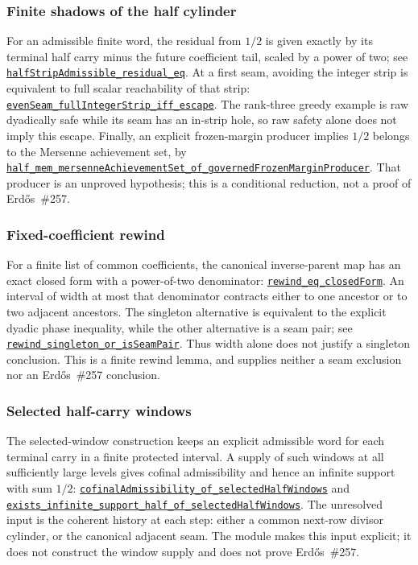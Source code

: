 \documentclass[11pt]{article}
\newcommand{\commit}{81150c1c6fdd4cd51e76d3aa0de344341e0e9e7c}
\newcommand{\repobase}{https://github.com/wcook04/plectis-lean-erdos249-257/blob/\commit}
\newcommand{\PK}{Erdos249257}
\newcommand{\lref}[3]{\href{\repobase/\PK/#1\#L#2}{\nolinkurl{#3}}}
\newcommand{\lrefx}[3]{\href{\repobase/\PK/#1\#L#2}{\nolinkurl{#3}}}
\theoremstyle{definition}
\theoremstyle{remark}
\begin{document}
\subsubsection{Finite shadows of the half cylinder}\label{res:halfcylindershadow}

For an admissible finite word, the residual from $1/2$ is given exactly by its
terminal half carry minus the future coefficient tail, scaled by a power of
two; see
\lref{HalfCylinderFiniteShadow.lean}{55}{halfStripAdmissible_residual_eq}.
At a first seam, avoiding the integer strip is equivalent to full scalar
reachability of that strip:
\lrefx{HalfCylinderFiniteShadow.lean}{807}{evenSeam_fullIntegerStrip_iff_escape}.
The rank-three greedy example is raw dyadically safe while its seam has an
in-strip hole, so raw safety alone does not imply this escape.  Finally, an
explicit frozen-margin producer implies $1/2$ belongs to the Mersenne
achievement set, by
\lrefx{HalfCylinderFiniteShadow.lean}{1256}{half_mem_mersenneAchievementSet_of_governedFrozenMarginProducer}.
That producer is an unproved hypothesis; this is a conditional reduction, not
a proof of Erd\H{o}s~\#257.

\subsubsection{Fixed-coefficient rewind}\label{res:fixedcoeffrewind}

For a finite list of common coefficients, the canonical inverse-parent map has
an exact closed form with a power-of-two denominator:
\lref{HalfCarryCeilParentContraction.lean}{49}{rewind_eq_closedForm}.
An interval of width at most that denominator contracts either to one ancestor
or to two adjacent ancestors.  The singleton alternative is equivalent to the
explicit dyadic phase inequality, while the other alternative is a seam pair;
see
\lrefx{HalfCarryCeilParentContraction.lean}{180}{rewind_singleton_or_isSeamPair}.
Thus width alone does not justify a singleton conclusion.  This is a finite
rewind lemma, and supplies neither a seam exclusion nor an Erd\H{o}s~\#257
conclusion.

\subsubsection{Selected half-carry windows}\label{res:selectedhalfwindow}

The selected-window construction keeps an explicit admissible word for each
terminal carry in a finite protected interval.  A supply of such windows at
all sufficiently large levels gives cofinal admissibility and hence an
infinite support with sum $1/2$:
\lref{HalfCarrySelectedWindow.lean}{831}{cofinalAdmissibility_of_selectedHalfWindows}
and
\lrefx{HalfCarrySelectedWindow.lean}{864}{exists_infinite_support_half_of_selectedHalfWindows}.
The unresolved input is the coherent history at each step: either a common
next-row divisor cylinder, or the canonical adjacent seam.  The module makes
this input explicit; it does not construct the window supply and does not
prove Erd\H{o}s~\#257.
\end{document}
